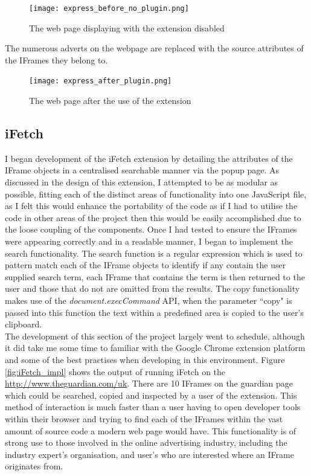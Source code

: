 \documentclass[12pt]{article}
\begin{document}
\begin{figure}[H]
    \centering
    \texttt{[image: express\_before\_no\_plugin.png]}
    \caption{The web page displaying with the extension disabled}
    \label{fig:express_before_no_plugin}
\end{figure}

The numerous adverts on the webpage are replaced with the source attributes of the IFrames they belong to.

\begin{figure}[H]
    \centering
    \texttt{[image: express\_after\_plugin.png]}
    \caption{The web page after the use of the extension}
    \label{fig:express_after_plugin}
\end{figure}

\subsection{iFetch}
I began development of the iFetch extension by detailing the attributes of the IFrame objects in a centralised searchable manner via the popup page. As discussed in the design of this extension, I attempted to be as modular as possible, fitting each of the distinct areas of functionality into one JavaScript file, as I felt this would enhance the portability of the code as if I had to utilise the code in other areas of the project then this would be easily accomplished due to the loose coupling of the components. Once I had tested to ensure the IFrames were appearing correctly and in a readable manner, I began to implement the search functionality. The search function is a regular expression which is used to pattern match each of the IFrame objects to identify if any contain the user supplied search term, each IFrame that contains the term is then returned to the user and those that do not are omitted from the results. The copy functionality makes use of the \textit{document.execCommand} API, when the parameter ``copy" is passed into this function the text within a predefined area is copied to the user's clipboard. \\

The development of this section of the project largely went to schedule, although it did take me some time to familiar with the Google Chrome extension platform and some of the best practises when developing in this environment. Figure \ref{fig:iFetch_impl} shows the output of running iFetch on the \url{http://www.theguardian.com/uk}. There are 10 IFrames on the guardian page which could be searched, copied and inspected by a user of the extension. This method of interaction is much faster than a user having to open developer tools within their browser and trying to find each of the IFrames within the vast amount of source code a modern web page would have. This functionality is of strong use to those involved in the online advertising industry, including the industry expert's organisation, and user's who are interested where an IFrame originates from.     
\end{document}
